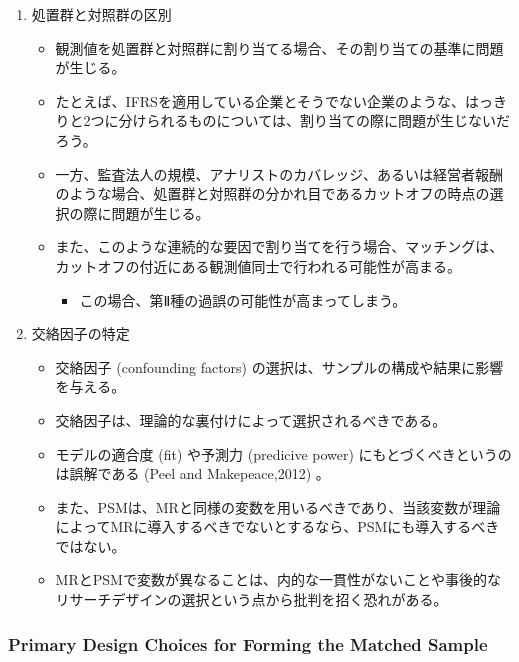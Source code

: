 \begin{enumerate}
 \item 処置群と対照群の区別
   \begin{itemize}
    \item 観測値を処置群と対照群に割り当てる場合、その割り当ての基準に問題が生じる。
    \item たとえば、IFRSを適用している企業とそうでない企業のような、はっきりと2つに分けられるものについては、割り当ての際に問題が生じないだろう。
    \item 一方、監査法人の規模、アナリストのカバレッジ、あるいは経営者報酬のような場合、処置群と対照群の分かれ目であるカットオフの時点の選択の際に問題が生じる。
    \item また、このような連続的な要因で割り当てを行う場合、マッチングは、カットオフの付近にある観測値同士で行われる可能性が高まる。
     \begin{itemize}
     \item この場合、第Ⅱ種の過誤の可能性が高まってしまう。
    \end{itemize}
   \end{itemize}
 \item 交絡因子の特定
   \begin{itemize}
    \item 交絡因子 (confounding factors) の選択は、サンプルの構成や結果に影響を与える。
    \item 交絡因子は、理論的な裏付けによって選択されるべきである。
    \item モデルの適合度 (fit) や予測力 (predicive power) にもとづくべきというのは誤解である (Peel and Makepeace,2012) 。
    \item また、PSMは、MRと同様の変数を用いるべきであり、当該変数が理論によってMRに導入するべきでないとするなら、PSMにも導入するべきではない。
    \item MRとPSMで変数が異なることは、内的な一貫性がないことや事後的なリサーチデザインの選択という点から批判を招く恐れがある。
   \end{itemize}
\end{enumerate}

\subsubsection*{Primary Design Choices for Forming the Matched Sample}

